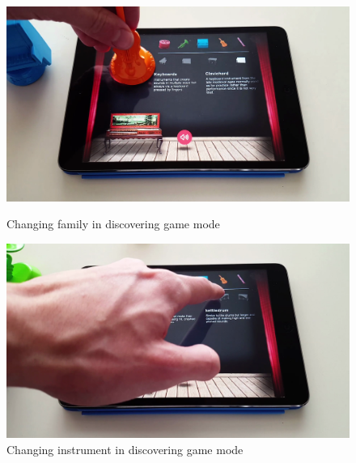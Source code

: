 \begin{figure}[ht!]
  \centering
  \includegraphics[width=350pt]{graphics/game-play/change_family_discovering.png}
  \vspace{0.05cm}
  \caption{Changing family in discovering game mode}
  \vspace{1cm}

  \includegraphics[width=350pt]{graphics/game-play/change_instrument_discovering.png}
  \vspace{0.05cm}
  \caption{Changing instrument in discovering game mode}
\end{figure}


